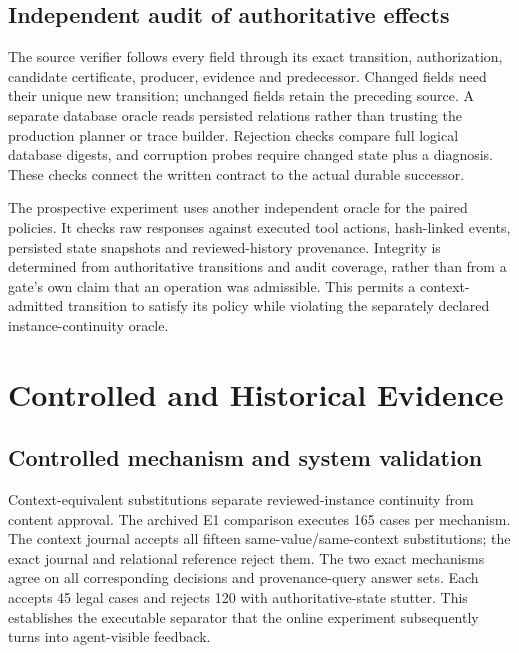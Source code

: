 \documentclass[10pt,a4paper,twocolumn]{article}
\begin{document}
\subsection{Independent audit of authoritative effects}
The source verifier follows every field through its exact transition, authorization, candidate certificate, producer, evidence and predecessor. Changed fields need their unique new transition; unchanged fields retain the preceding source. A separate database oracle reads persisted relations rather than trusting the production planner or trace builder. Rejection checks compare full logical database digests, and corruption probes require changed state plus a diagnosis. These checks connect the written contract to the actual durable successor.

The prospective experiment uses another independent oracle for the paired policies. It checks raw responses against executed tool actions, hash-linked events, persisted state snapshots and reviewed-history provenance. Integrity is determined from authoritative transitions and audit coverage, rather than from a gate's own claim that an operation was admissible. This permits a context-admitted transition to satisfy its policy while violating the separately declared instance-continuity oracle.

\section{Controlled and Historical Evidence}
\subsection{Controlled mechanism and system validation}
Context-equivalent substitutions separate reviewed-instance continuity from content approval. The archived E1 comparison executes 165 cases per mechanism. The context journal accepts all fifteen same-value/same-context substitutions; the exact journal and relational reference reject them. The two exact mechanisms agree on all corresponding decisions and provenance-query answer sets. Each accepts 45 legal cases and rejects 120 with authoritative-state stutter. This establishes the executable separator that the online experiment subsequently turns into agent-visible feedback.
\end{document}
